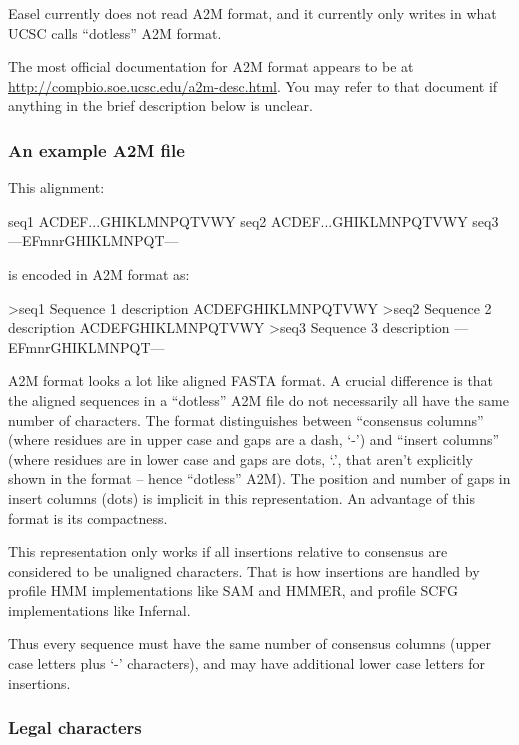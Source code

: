 
Easel currently does not read A2M format, and it currently only writes
in what UCSC calls ``dotless'' A2M format.

The most official documentation for A2M format appears to be at
\url{http://compbio.soe.ucsc.edu/a2m-desc.html}. You may refer to that
document if anything in the brief description below is unclear.

\subsubsection{An example A2M file}

This alignment:

\begin{cchunk}
seq1  ACDEF...GHIKLMNPQTVWY
seq2  ACDEF...GHIKLMNPQTVWY
seq3  ---EFmnrGHIKLMNPQT---
\end{cchunk}

\noindent 
is encoded in A2M format as:

\begin{cchunk}
>seq1  Sequence 1 description
ACDEFGHIKLMNPQTVWY
>seq2  Sequence 2 description
ACDEFGHIKLMNPQTVWY
>seq3  Sequence 3 description
---EFmnrGHIKLMNPQT---
\end{cchunk}

A2M format looks a lot like aligned FASTA format. A crucial difference
is that the aligned sequences in a ``dotless'' A2M file do not
necessarily all have the same number of characters. The format
distinguishes between ``consensus columns'' (where residues are in
upper case and gaps are a dash, `-') and ``insert columns'' (where
residues are in lower case and gaps are dots, `.', that aren't
explicitly shown in the format -- hence ``dotless'' A2M). The position
and number of gaps in insert columns (dots) is implicit in this
representation.  An advantage of this format is its compactness.

This representation only works if all insertions relative to consensus
are considered to be unaligned characters. That is how insertions are
handled by profile HMM implementations like SAM and HMMER, and profile
SCFG implementations like Infernal.

Thus every sequence must have the same number of consensus columns
(upper case letters plus `-' characters), and may have additional lower
case letters for insertions.

\subsubsection{Legal characters}

